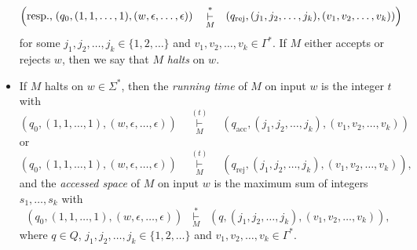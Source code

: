 \begin{definition}
\begin{itemize}
\begin{align*}
      \Bigl(\text{resp.,} \;
      (q_0, (1, 1, \dots, 1), (w, \epsilon, \dots, \epsilon))
      \quad &\mathop\vdash\limits_{M}^* \quad
      (q_\text{rej}, (j_1, j_2, \dots, j_k), (v_1, v_2, \dots, v_k))
      \Bigr)
    \end{align*}
    for some $j_1, j_2, \dots, j_k \in \{1, 2, \dots\}$ and
    $v_1, v_2, \dots, v_k \in \Gamma^*$.
    If $M$ either accepts or rejects $w$, then we say that $M$ \emph{halts} on
    $w$.
    \item If $M$ halts on $w \in \Sigma^*$, then the \emph{running time} of $M$
    on input $w$ is the integer $t$ with
    \begin{equation*}
      (q_0, (1, 1, \dots, 1), (w, \epsilon, \dots, \epsilon))
      \quad \mathop\vdash\limits_{M}^{(t)} \quad
      (q_\text{acc}, (j_1, j_2, \dots, j_k), (v_1, v_2, \dots, v_k))
    \end{equation*}
    or
    \begin{equation*}
      (q_0, (1, 1, \dots, 1), (w, \epsilon, \dots, \epsilon))
      \quad \mathop\vdash\limits_{M}^{(t)} \quad
      (q_\text{rej}, (j_1, j_2, \dots, j_k), (v_1, v_2, \dots, v_k)),
    \end{equation*}
    and the \emph{accessed space} of $M$ on input $w$ is the maximum sum of
    integers $s_1, \dots, s_k$ with
    \begin{equation*}
      (q_0, (1, 1, \dots, 1), (w, \epsilon, \dots, \epsilon))
      \;\; \mathop\vdash\limits_{M}^* \;\;
      (q, (j_1, j_2, \dots, j_k), (v_1, v_2, \dots, v_k)),
    \end{equation*}
    where $q \in Q$, $j_1, j_2, \dots, j_k \in \{1, 2, \dots\}$ and
    $v_1, v_2, \dots, v_k \in \Gamma^*$.
  \end{itemize}
\end{definition}

